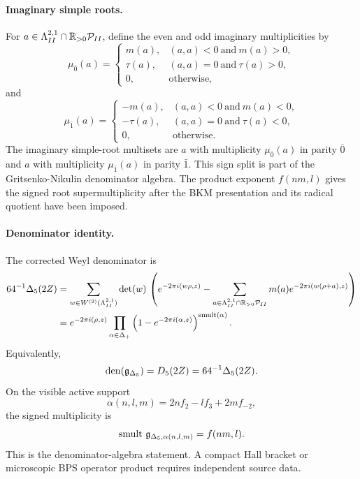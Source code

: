 \paragraph{Imaginary simple roots.}
For \(a\in\Lambda^{2,1}_{II}\cap\mathbb R_{>0}\mathcal P_{II}\), define the even and odd
imaginary multiplicities by
\[
  \mu_{\bar 0}(a)=
  \begin{cases}
  m(a),& (a,a)<0\ \text{and}\ m(a)>0,\\
  \tau(a),& (a,a)=0\ \text{and}\ \tau(a)>0,\\
  0,& \text{otherwise},
  \end{cases}
\]
and
\[
  \mu_{\bar 1}(a)=
  \begin{cases}
  -m(a),& (a,a)<0\ \text{and}\ m(a)<0,\\
  -\tau(a),& (a,a)=0\ \text{and}\ \tau(a)<0,\\
  0,& \text{otherwise}.
  \end{cases}
\]
The imaginary simple-root multisets are \(a\) with multiplicity
\(\mu_{\bar0}(a)\) in parity \(\bar0\) and \(a\) with multiplicity
\(\mu_{\bar1}(a)\) in parity \(\bar1\). This sign split is part of the
Gritsenko-Nikulin denominator algebra. The product exponent
\(f(nm,l)\) gives the signed root supermultiplicity after the BKM
presentation and its radical quotient have been imposed.

\paragraph{Denominator identity.}
The corrected Weyl denominator is
\[
\begin{aligned}
  64^{-1}\Delta_5(2Z)
  &=
  \sum_{w\in W^{(2)}(\Lambda^{2,1}_{II})}\det(w)\,
  \left(
  e^{-2\pi i(w\rho,z)}
  -
  \sum_{a\in\Lambda^{2,1}_{II}\cap\mathbb R_{>0}\mathcal P_{II}}
  m(a)e^{-2\pi i(w(\rho+a),z)}
  \right) \\
  &=
  e^{-2\pi i(\rho,z)}
  \prod_{\alpha\in\Delta_+}
  \left(1-e^{-2\pi i(\alpha,z)}\right)^{\operatorname{smult}(\alpha)} .
\end{aligned}
\]
Equivalently,
\[
  \operatorname{den}(\mathfrak g_{\Delta_5})=D_5(2Z)=64^{-1}\Delta_5(2Z).
\]
On the visible active support
\[
  \alpha(n,l,m)=2nf_2-lf_3+2mf_{-2},
\]
the signed multiplicity is
\[
  \operatorname{smult}\,\mathfrak g_{\Delta_5,\alpha(n,l,m)}=f(nm,l).
\]
This is the denominator-algebra statement. A compact Hall bracket or
microscopic BPS operator product requires independent source data.

